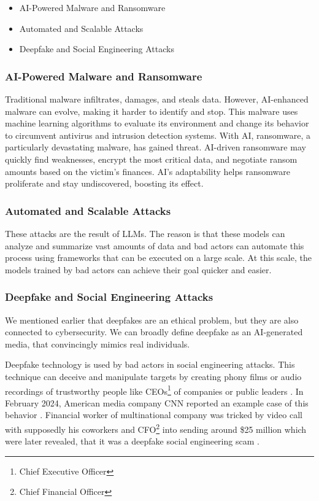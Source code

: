 \begin{itemize}
    \item AI-Powered Malware and Ransomware
    \item Automated and Scalable Attacks
    \item Deepfake and Social Engineering Attacks
\end{itemize}

\subsubsection*{AI-Powered Malware and Ransomware}

Traditional malware infiltrates, damages, and steals data. However, AI-enhanced malware can evolve, making it harder to identify and stop. This malware uses machine learning algorithms to evaluate its environment and change its behavior to circumvent antivirus and intrusion detection systems.
With AI, ransomware, a particularly devastating malware, has gained threat. AI-driven ransomware may quickly find weaknesses, encrypt the most critical data, and negotiate ransom amounts based on the victim's finances. AI's adaptability helps ransomware proliferate and stay undiscovered, boosting its effect\cite{Princess-Egbuna_2021}.

\subsubsection*{Automated and Scalable Attacks}

These attacks are the result of LLMs. The reason is that these models can analyze and summarize vast amounts of data and bad actors can automate this process using frameworks that can be executed on a large scale. At this scale, the models trained by bad actors can achieve their goal quicker and easier.

\subsubsection*{Deepfake and Social Engineering Attacks}

We mentioned earlier that deepfakes are an ethical problem, but they are also connected to cybersecurity. We can broadly define deepfake as an AI-generated media, that convincingly mimics real individuals.

Deepfake technology is used by bad actors in social engineering attacks. This technique can deceive and manipulate targets by creating phony films or audio recordings of trustworthy people like CEOs\footnote{Chief Executive Officer} of companies or public leaders \cite{Princess-Egbuna_2021}. In February 2024, American media company CNN reported an example case of this behavior \cite{deepfake_CFO}. Financial worker of multinational company was tricked by video call with supposedly his coworkers and CFO\footnote{Chief Financial Officer} into sending around \$25 million which were later revealed, that it was a deepfake social engineering scam \cite{deepfake_CFO}.

